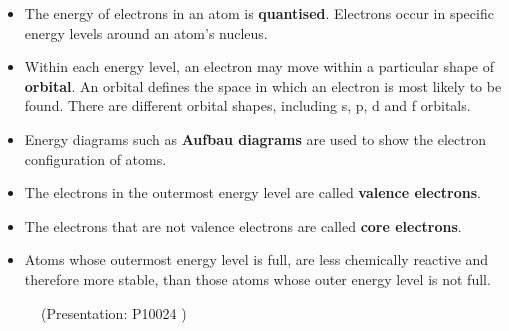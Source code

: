 \begin{itemize}[noitemsep]
\label{m38741*uid178}\item The energy of electrons in an atom is \textbf{quantised}. Electrons occur in specific energy levels around an atom's nucleus.
\label{m38741*uid179}\item Within each energy level, an electron may move within a particular shape of \textbf{orbital}. An orbital defines the space in which an electron is most likely to be found. There are different orbital shapes, including s, p, d and f orbitals.
\label{m38741*uid180}\item Energy diagrams such as \textbf{Aufbau diagrams} are used to show the electron configuration of atoms.
\label{m38741*uid181}\item The electrons in the outermost energy level are called \textbf{valence electrons}.
\label{m38741*uid182}\item The electrons that are not valence electrons are called \textbf{core electrons}.
\label{m38741*uid183}\item Atoms whose outermost energy level is full, are less chemically reactive and therefore more stable, than those atoms whose outer energy level is not full.
\end{itemize}
\label{m38741*eip-867}
    \setcounter{subfigure}{0}
	\begin{figure}[H] %
    \label{m38741*slidesharemedia2}\label{m38741*slideshareflash2}
             { (Presentation:  P10024 )}
      \vspace{2pt}
    \vspace{.1in}
 \end{figure}       \par \label{m38741*secfhsst!!!underscore!!!id1140}
